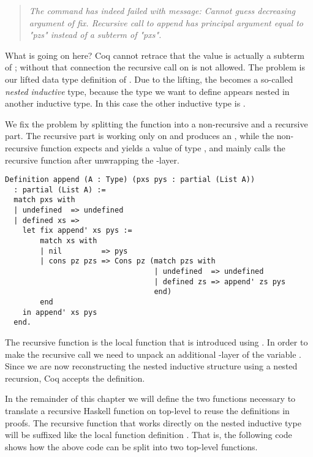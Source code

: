 \begin{quote}
\emph{The command has indeed failed with message: Cannot guess decreasing
argument of fix.
Recursive call to append has principal argument equal to "pzs" instead of a subterm of "pxs".}
\end{quote}

What is going on here?
Coq cannot retrace that the value  is actually a subterm of ; without that connection the recursive call on  is not allowed.
The problem is our lifted data type definition of
.
Due to the lifting, the  becomes a so\--called \emph{nested inductive} type, because the type we want to define
appears nested in another inductive type.
In this case the other inductive type is .

We fix the problem by splitting the function into a non\--recursive and a recursive part.
The recursive part is working only on  and produces an , while the non\--recursive
function expects and yields a value of type , and mainly calls the recursive function after unwrapping the
\--layer.

\begin{verbatim}
Definition append (A : Type) (pxs pys : partial (List A))
  : partial (List A) :=
  match pxs with
  | undefined  => undefined
  | defined xs =>
    let fix append' xs pys :=
        match xs with
        | nil         => pys
        | cons pz pzs => Cons pz (match pzs with
                                  | undefined  => undefined
                                  | defined zs => append' zs pys
                                  end)
        end
    in append' xs pys
  end.
\end{verbatim}

The recursive function is the local function  that is introduced using .
In order to make the recursive call we need to unpack an additional \--layer of the variable .
Since we are now reconstructing the nested inductive structure using a nested recursion, Coq accepts the definition.

In the remainder of this chapter we will define the two functions necessary to translate a recursive Haskell function on top\--level to reuse the definitions in proofs.
The recursive function that works directly on the nested inductive type will be suffixed like the local function definition .
That is, the following code shows how the above code can be split into two top\--level functions.

